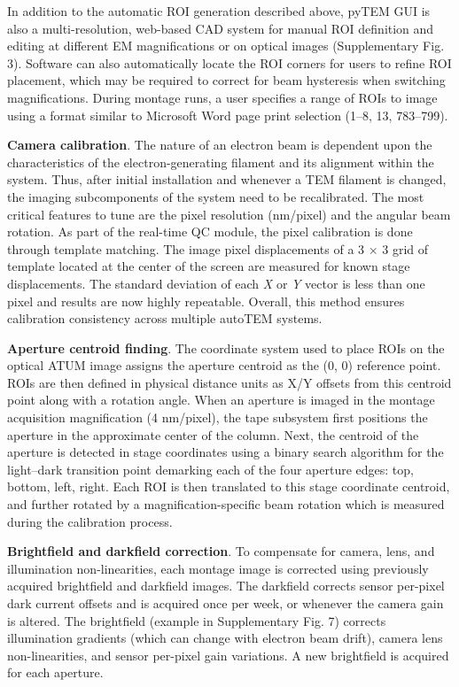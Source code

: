 \documentclass{article}
\begin{document}
{In addition to the automatic ROI generation described above, pyTEM GUI is also a multi-resolution, web-based CAD system for manual ROI definition and editing at different EM magnifications or on optical images (Supplementary Fig. 3). Software can also automatically locate the ROI corners for users to refine ROI placement, which may be required to correct for beam hysteresis when switching magnifications. During montage runs, a user specifies a range of ROIs to image using a format similar to Microsoft Word page print selection (1–8, 13, 783–799).

\noindent\textbf{Camera calibration}. The nature of an electron beam is dependent upon the characteristics of the electron-generating filament and its alignment within the system. Thus, after initial installation and whenever a TEM filament is changed, the imaging subcomponents of the system need to be recalibrated. The most critical features to tune are the pixel resolution (nm/pixel) and the angular beam rotation. As part of the real-time QC module, the pixel calibration is done through template matching. The image pixel displacements of a 3 × 3 grid of template located at the center of the screen are measured for known stage displacements. The standard deviation of each \emph{X} or \emph{Y} vector is less than one pixel and results are now highly repeatable. Overall, this method ensures calibration consistency across multiple autoTEM systems.

\noindent\textbf{Aperture centroid finding}. The coordinate system used to place ROIs on the optical ATUM image assigns the aperture centroid as the (0, 0) reference point. ROIs are then defined in physical distance units as X/Y offsets from this centroid point along with a rotation angle. When an aperture is imaged in the montage acquisition magnification (4 nm/pixel), the tape subsystem first positions the aperture in the approximate center of the column. Next, the centroid of the aperture is detected in stage coordinates using a binary search algorithm for the light–dark transition point demarking each of the four aperture edges: top, bottom, left, right. Each ROI is then translated to this stage coordinate centroid, and further rotated by a magnification-specific beam rotation which is measured during the calibration process.

\noindent\textbf{Brightfield and darkfield correction}. To compensate for camera, lens, and illumination non-linearities, each montage image is corrected using previously acquired brightfield and darkfield images. The darkfield corrects sensor per-pixel dark current offsets and is acquired once per week, or whenever the camera gain is altered. The brightfield (example in Supplementary Fig. 7) corrects illumination gradients (which can change with electron beam drift), camera lens non-linearities, and sensor per-pixel gain variations. A new brightfield is acquired for each aperture.

}
\end{document}
